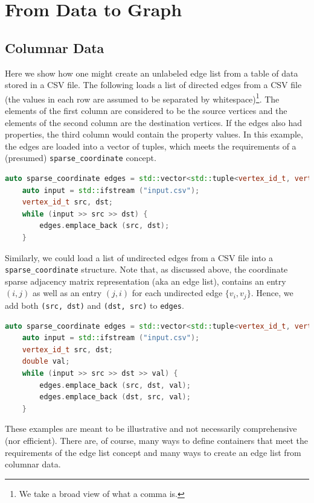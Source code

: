 \section{From Data to Graph}

\subsection{Columnar Data}
Here we show how one might create an unlabeled edge list from a table of data stored in a CSV file.  The following loads a list of directed edges from a CSV file (the values in each row are assumed to be separated by whitespace)\footnote{We take a broad view of what a comma is.}.
The elements of the first column are considered to be the source vertices and the elements of
the second column are the destination vertices. If the edges also had properties, the third column
would contain the property values.  In this example, the edges are loaded into a vector of tuples, which meets the requirements of a (presumed) \lstinline{sparse_coordinate} concept.
\begin{lstlisting}[language=C++]
    auto sparse_coordinate edges = std::vector<std::tuple<vertex_id_t, vertex_id_t>;
    auto input = std::ifstream ("input.csv");
    vertex_id_t src, dst;
    while (input >> src >> dst) {
        edges.emplace_back (src, dst);
    }
\end{lstlisting}

Similarly, we could load a list of undirected edges from a CSV file into a 
\lstinline{sparse_coordinate} structure.  
Note that, as discussed above, the coordinate sparse adjacency matrix representation (aka an edge list), contains an entry $(i, j)$ as well as an entry $(j, i)$ for each undirected edge $\{ v_i, v_j \}$.  Hence, we add both \lstinline{(src, dst)} and  \lstinline{(dst, src)} to \lstinline{edges}.
\begin{lstlisting}[language=C++]
    auto sparse_coordinate edges = std::vector<std::tuple<vertex_id_t, vertex_id_t, double> edges;
    auto input = std::ifstream ("input.csv");
    vertex_id_t src, dst;
    double val;
    while (input >> src >> dst >> val) {
        edges.emplace_back (src, dst, val);
        edges.emplace_back (dst, src, val);
    }
\end{lstlisting}

These examples are meant to be illustrative and not necessarily
comprehensive (nor efficient).
There are, of course, many ways to define containers that meet the
requirements of the edge list concept and many ways to
create an edge list from columnar data.

